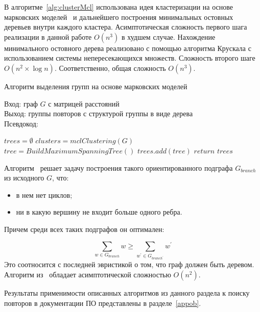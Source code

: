 В алгоритме~\ref{alg:clusterMcl} использована идея кластеризации на основе марковских моделей~\cite{dongen2000cluster} и дальнейшего построения минимальных остовных деревьев внутри каждого кластера.
 Асимптотическая сложность первого шага реализации в данной работе $O(n^3)$ в худшем случае.
 Нахождение минимального остовного дерева реализовано с помощью алгоритма Крускала с использованием системы непересекающихся множеств. Сложность второго шаге $O(n^2 \times \log n)$.
 Соответственно, общая сложность $O(n^3)$.

\begin{algorithm}[t!]
\caption{Алгоритм выделения групп на основе марковских моделей}\label{alg:clusterMcl}
Вход: граф $G$ с матрицей расстояний\\
Выход: группы повторов с структурой группы в виде дерева\\
Псевдокод:
\begin{algorithmic}[1]
\State $trees = \emptyset$
\State $ clusters = mclClustering(G)$
\State $tree =  BuildMaximumSpanningTree()$
\State $trees.add(tree)$
\EndFor
\State
\State $return$ $trees$
\end{algorithmic}
\end{algorithm}


Алгоритм~\cite{tofigh2009optimum}  решает задачу построения такого ориентированного подграфа $G_{branch}$ из исходного $G$, что:
\begin{itemize}
    \item в нем нет циклов;
    \item ни в какую вершину не входит больше одного ребра.
\end{itemize}

Причем среди всех таких подграфов он оптимален:

\begin{equation}
\sum_{w \in G_{branch}} w \geq \sum_{w^{'} \in G_{branch^{'}}} w^{'}
\end{equation}
Это соотносится с последней эвристикой о том, что граф должен быть деревом.
Алгоритм из~\cite{tofigh2009optimum} обладает асимптотической сложностью $O(n^2)$.

%  

\vspace{10 mm}
Результаты применимости описанных алгоритмов из данного раздела к поиску повторов в документации ПО представлены в разделе~\ref{appob}.

